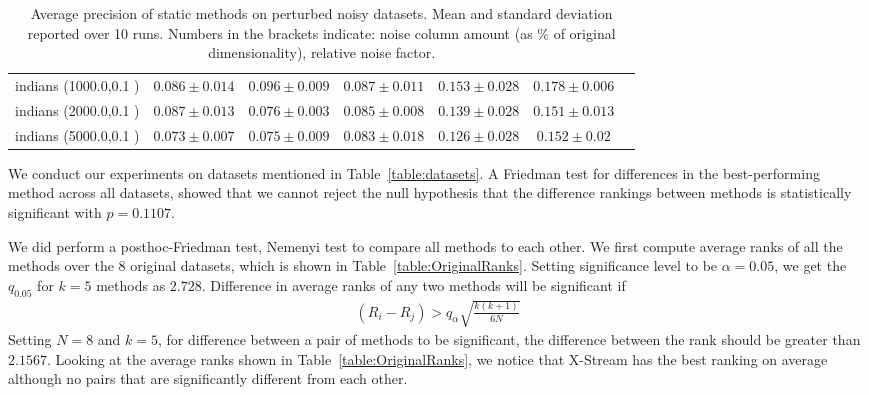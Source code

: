 \documentclass[11pt,onecolumn]{article}
\begin{document}
\begin{footnotesize}
\begin{table}[p!]
\begin{tabular}{lcccccc}
indians (1000.0,0.1 )& $0.086 \pm 0.014$ &  $0.096 \pm 0.009$ &  $0.087 \pm 0.011$ &  $0.153 \pm 0.028$ &  $0.178 \pm 0.006$    \\
indians (2000.0,0.1 )& $0.087 \pm 0.013$ &  $0.076 \pm 0.003$ &  $0.085 \pm 0.008$ &  $0.139 \pm 0.028$ &  $0.151 \pm 0.013$    \\
indians (5000.0,0.1 )& $0.073 \pm 0.007$ &  $0.075 \pm 0.009$ &  $0.083 \pm 0.018$ &  $0.126 \pm 0.028$ &  $0.152 \pm 0.02$    \\
				\bottomrule
		\end{tabular}
		\caption{Average precision of static methods on perturbed noisy datasets. Mean and standard deviation reported over 10 runs. Numbers in the brackets indicate: noise column amount (as $\%$ of original dimensionality), relative noise factor.}
		\label{table:static-results}
\end{table}
\end{footnotesize}

We conduct our experiments on datasets mentioned in Table~\ref{table:datasets}. A Friedman test for differences in the best-performing method across all datasets, showed that we cannot reject the null hypothesis that the difference rankings between methods is statistically significant with $p=0.1107$. 

We did perform a posthoc-Friedman test, Nemenyi test to compare all methods to each other. We first compute average ranks of all the methods over the  $8$ original datasets, which is shown in Table~\ref{table:OriginalRanks}. Setting significance level to be $\alpha=0.05$, we get the $q_{0.05}$ for $k=5$ methods as $2.728$. Difference in average ranks of any two methods will be significant if 
\begin{align}
(R_{i} - R_{j}) > q_{\alpha} \sqrt{\frac{k(k+1)}{6N}}
\end{align}
Setting $N=8$ and $k=5$, for difference between a pair of methods to be significant, the difference between the rank should be greater than $2.1567$. Looking at the average ranks shown in Table~\ref{table:OriginalRanks}, we notice that X-Stream has the best ranking on average although no pairs that are significantly different from each other. 
\end{document}
